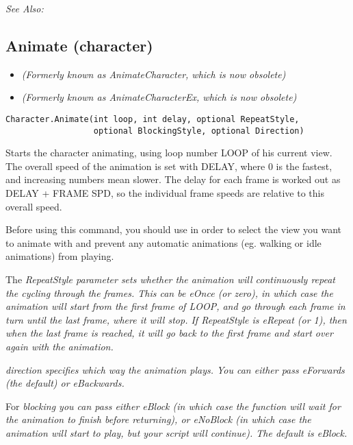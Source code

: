 \it{See Also:} 


\subsection{Animate (character)}\label{Character.Animate}%

\begin{itemize}
\item \it{(Formerly known as AnimateCharacter, which is now obsolete)}
\item \it{(Formerly known as AnimateCharacterEx, which is now obsolete)}
\end{itemize}

\begin{verbatim}
Character.Animate(int loop, int delay, optional RepeatStyle,
                  optional BlockingStyle, optional Direction)
\end{verbatim}
Starts the character animating, using loop number LOOP of his current view. The
overall speed of the animation is set with DELAY, where 0 is the fastest, and
increasing numbers mean slower. The delay for each frame is worked out as DELAY + FRAME SPD,
so the individual frame speeds are relative to this overall speed.

Before using this command, you should use  in order
to select the view you want to animate with and prevent any automatic animations (eg.
walking or idle animations) from playing.

The \it{RepeatStyle} parameter sets whether the animation will continuously repeat
the cycling through the frames. This can be \it{eOnce} (or zero), in which case the animation
will start from the first frame of LOOP, and go through each frame in turn until the
last frame, where it will stop. If RepeatStyle is \it{eRepeat} (or 1), then when the last frame
is reached, it will go back to the first frame and start over again with the animation.

\it{direction} specifies which way the animation plays. You can either pass eForwards (the
default) or eBackwards.

For \it{blocking} you can pass either eBlock (in which case the function will wait
for the animation to finish before returning), or eNoBlock (in which case the animation
will start to play, but your script will continue). The default is eBlock.

